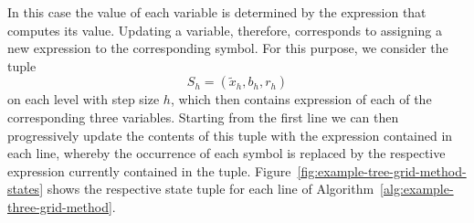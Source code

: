 In this case the value of each variable is determined by the expression that computes its value.
Updating a variable, therefore, corresponds to assigning a new expression to the corresponding symbol.
For this purpose, we consider the tuple
\begin{equation*}
	S_h = (\tilde{x}_h, b_h, r_h)
\end{equation*} 
on each level with step size $h$, which then contains expression of each of the corresponding three variables.
Starting from the first line we can then progressively update the contents of this tuple with the expression contained in each line, whereby the occurrence of each symbol is replaced by the respective expression currently contained in the tuple.
Figure~\ref{fig:example-tree-grid-method-states} shows the respective state tuple for each line of Algorithm~\ref{alg:example-three-grid-method}.
